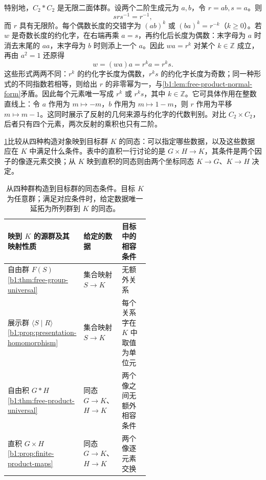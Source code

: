 \ProseParagraphBreak
特别地，\(C_2*C_2\) 是无限二面体群。设两个二阶生成元为 \(a,b\)，令 \(r=ab,s=a\)。则
\[
	srs^{-1}=r^{-1},
\]
而 \(r\) 具有无限阶。每个偶数长度的交错字为 \((ab)^k\) 或 \((ba)^k=r^{-k}\)（\(k\ge0\)）。若 \(w\) 是奇数长度的约化字，在右端再乘 \(a=s\)，再约化后长度为偶数：末字母为 \(a\) 时消去末尾的 \(aa\)，末字母为 \(b\) 时则添上一个 \(a\)。因此 \(wa=r^k\) 对某个 \(k\in\mathbb Z\) 成立，再由 \(a^2=1\) 还原得
\[
	w=(wa)a=r^ka=r^ks.
\]
这些形式两两不同：\(r^k\) 的约化字长度为偶数，\(r^ks\) 的约化字长度为奇数；同一种形式的不同指数若相等，则给出 \(r\) 的非零幂为一，与\cref{b1:lem:free-product-normal-form}矛盾。因此每个元素唯一写成 \(r^k\) 或 \(r^ks\)，其中 \(k\in\mathbb Z\)。它可具体作用在整数直线上：令 \(a\) 作用为 \(m\mapsto-m\)，\(b\) 作用为 \(m\mapsto1-m\)，则 \(r\) 作用为平移 \(m\mapsto m-1\)。这同时展示了反射的几何来源与约化字的代数判别。对比 \(C_2\times C_2\)，后者只有四个元素，两次反射的乘积也只有二阶。

\ProseParagraphBreak
\cref{b1:tab:group-construction-maps}比较从四种构造对象映到目标群 \(K\) 的同态：可以指定哪些数据，以及这些数据应在 \(K\) 中满足什么条件。表中的直积一行讨论的是 \(G\times H\to K\)，其条件是两个因子的像逐元素交换；从 \(K\) 映到直积的同态则由两个坐标同态 \(K\to G\)、\(K\to H\) 决定。

\begin{table}[htbp]
	\centering
	\caption[四种群构造的同态条件]{从四种群构造到目标群的同态条件。目标 \(K\) 为任意群；满足对应条件时，给定数据唯一延拓为所列群到 \(K\) 的同态。}
	\label{b1:tab:group-construction-maps}
	\begin{tabularx}{\linewidth}{@{}>{\raggedright\arraybackslash}p{0.28\linewidth}>{\raggedright\arraybackslash}p{0.27\linewidth}>{\raggedright\arraybackslash}X@{}}
		\toprule
		映到 \(K\) 的源群及其映射性质 & 给定的数据 & 目标中的相容条件 \\
		\midrule
		自由群 \(F(S)\)\newline \cref{b1:thm:free-group-universal} & 集合映射 \(S\to K\) & 无额外关系 \\
		\addlinespace
		展示群 \(\langle S\mid R\rangle\)\newline \cref{b1:prop:presentation-homomorphism} & 集合映射 \(S\to K\) & 每个关系字在 \(K\) 中取值为单位元 \\
		\addlinespace
		自由积 \(G*H\)\newline \cref{b1:thm:free-product-universal} & 同态 \(G\to K\)、\(H\to K\) & 两个像之间无额外相容条件 \\
		\addlinespace
		直积 \(G\times H\)\newline \cref{b1:prop:finite-product-maps} & 同态 \(G\to K\)、\(H\to K\) & 两个像逐元素交换 \\
		\bottomrule
	\end{tabularx}
\end{table}
